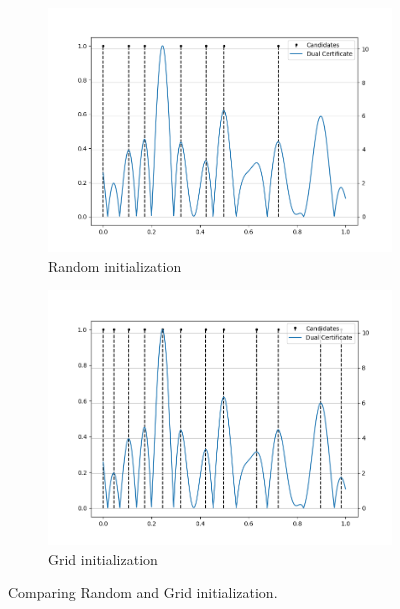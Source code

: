 \documentclass[a4paper,12pt,oneside]{report}
\theoremstyle{named}
\begin{document}
\begin{figure}
\centering
\begin{subfigure}[b]{0.9\textwidth}
   \includegraphics[width=1\linewidth]{random.png}
   \caption{Random initialization}
   \label{fig:random} 
\end{subfigure}

\begin{subfigure}[b]{0.9\textwidth}
   \includegraphics[width=1\linewidth]{grid.png}
   \caption{Grid initialization}
   \label{fig:grid} 
\end{subfigure}

\caption{Comparing Random and Grid initialization.}
\label{fig:randomvsgrid}
\end{figure}
\end{document}
